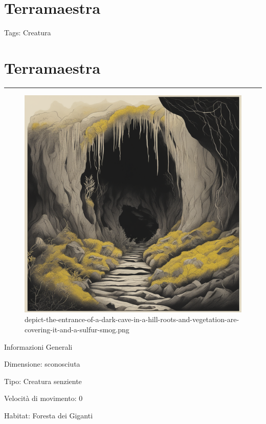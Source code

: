 \section{Terramaestra}\label{terramaestra}

Tags: Creatura

\section{Terramaestra}\label{terramaestra-1}

\begin{center}\rule{0.5\linewidth}{0.5pt}\end{center}

\begin{figure}
\centering
\includegraphics{depict-the-entrance-of-a-dark-cave-in-a-hill-roots-and-vegetation-are-covering-it-and-a-sulfur-smog.png}
\caption{depict-the-entrance-of-a-dark-cave-in-a-hill-roots-and-vegetation-are-covering-it-and-a-sulfur-smog.png}
\end{figure}

Informazioni Generali

Dimensione: sconosciuta

Tipo: Creatura senziente

Velocità di movimento: 0

Habitat: Foresta dei Giganti

